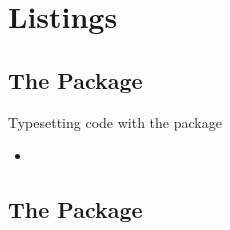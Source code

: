 \section{Listings}

\subsection{The  Package}
\begin{frame}{Typesetting code with the  package}
   \begin{itemize}
      \item
   \end{itemize}
\end{frame}

\subsection{The  Package}
\begin{frame}

\end{frame}